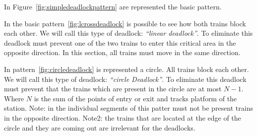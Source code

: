 \documentclass{ewic}
\begin{document}
			In Figure~\ref{fig:simpledeadlockpattern} are represented the basic pattern.
			
			
			In the basic pattern~\ref{fig:lcrossdeadlock} is possible to see how both trains block each other. We will call this type of deadlock: \emph{``linear deadlock''}. To eliminate this deadlock must prevent one of the two trains to enter this critical area in the opposite direction. In this section, all trains must move in the same direction.
			
			
			In pattern~\ref{fig:circledeadlock} is represented a circle. All trains block each other. We will call this type of deadlock:  \emph{``circle Deadlock''}. To eliminate this deadlock must prevent that the trains which are present in the circle are at most $N-1$. Where $N$ is the sum of the points of entry or exit and tracks platform of the station. Note: in the individual segments of this patter must not be present trains in the opposite direction. Note2: the trains that are located at the edge of the circle and they are coming out are irrelevant for the deadlocks.
			
\end{document}
